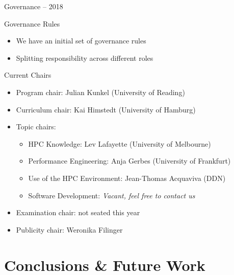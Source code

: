 \documentclass[compress,aspectratio=169]{beamer}
\begin{document}
\begin{frame}{Governance -- 2018}

  \begin{block}{Governance Rules}
    \vspace*{-0.3em}
    \begin{itemize}
      \item We have an initial set of governance rules
      \item Splitting responsibility across different roles
    \end{itemize}
  \end{block}

  \vspace*{-1em}

  \begin{block}{Current Chairs}
  \vspace*{-0.3em}
  \begin{itemize}
    \item Program chair: Julian Kunkel (University of Reading)
    \item Curriculum chair: Kai Himstedt (University of Hamburg)
    \item  Topic chairs:
    \begin{itemize}
      \item HPC Knowledge: Lev Lafayette (University of Melbourne)
      \item Performance Engineering: Anja Gerbes (University of Frankfurt)
      \item Use of the HPC Environment: Jean-Thomas Acquaviva (DDN)
      \item Software Development: \textit{Vacant, feel free to contact us}
    \end{itemize}
    \item Examination chair: not seated this year
    \item Publicity chair: Weronika Filinger
  \end{itemize}
  \end{block}
\end{frame}




\section{Conclusions \& Future Work}
\sectionIntroHidden
\end{document}

